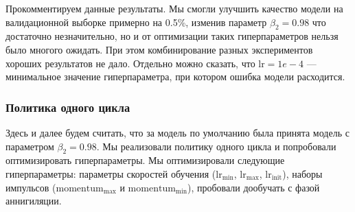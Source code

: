 \documentclass[conference]{IEEEtran}
\begin{document}
Прокомментируем данные результаты. Мы смогли улучшить качество модели на валидационной выборке примерно на 0.5\%, изменив параметр $\beta_2 = 0.98$ что достаточно незначительно, но и от оптимизации таких гиперпараметров нельзя было многого ожидать. При этом комбинирование разных экспериментов хороших результатов не дало. Отдельно можно сказать, что $\text{lr}=1e-4$ --- минимальное значение гиперпараметра, при котором ошибка модели расходится.

\subsubsection{Политика одного цикла}
Здесь и далее будем считать, что за модель по умолчанию была принята модель с параметром $\beta_2 = 0.98$. Мы реализовали политику одного цикла и попробовали оптимизировать гиперпараметры. Мы оптимизировали следующие гиперпараметры: параметры скоростей обучения ($\text{lr}_\text{min}$, $\text{lr}_\text{max}$, $\text{lr}_\text{init}$), наборы импульсов ($\text{momentum}_\text{max}$ и $\text{momentum}_\text{min}$), пробовали дообучать с фазой аннигиляции.
\end{document}
